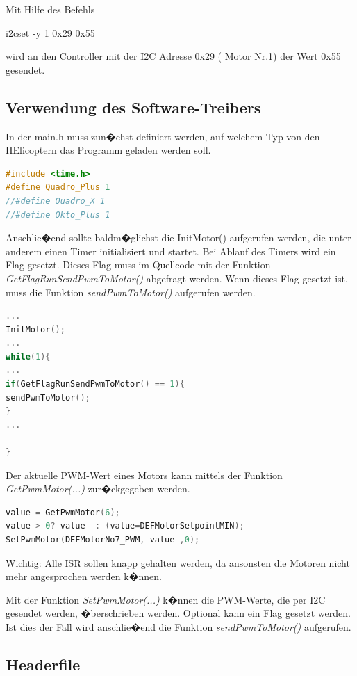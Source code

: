 Mit Hilfe des Befehls 

\begin{center}
	i2cset -y 1 0x29 0x55
\end{center}

wird an den Controller mit der I2C Adresse 0x29 ( Motor Nr.1) der Wert 0x55 gesendet.

\subsection{Verwendung des Software-Treibers}

In der main.h muss zun�chst definiert werden, auf welchem Typ von den HElicoptern das Programm geladen werden soll.
\begin{lstlisting}[language=C++]
#include <time.h>
#define Quadro_Plus 1
//#define Quadro_X 1
//#define Okto_Plus 1
\end{lstlisting}

Anschlie�end sollte baldm�glichst die InitMotor() aufgerufen werden, die unter anderem einen Timer initialisiert und startet. Bei Ablauf des Timers wird ein Flag gesetzt. Dieses Flag muss im Quellcode mit der Funktion \emph{GetFlagRunSendPwmToMotor()} abgefragt werden. Wenn dieses Flag gesetzt ist, muss die Funktion \emph{sendPwmToMotor()} aufgerufen werden.

\begin{lstlisting}[language=C++]
...
InitMotor();
...
while(1){
...
if(GetFlagRunSendPwmToMotor() == 1){
sendPwmToMotor();
}
...

}
\end{lstlisting}
Der aktuelle PWM-Wert eines Motors kann mittels der Funktion \emph{GetPwmMotor(...)} zur�ckgegeben werden.

\begin{lstlisting}[language=C++]
value = GetPwmMotor(6);
value > 0? value--: (value=DEFMotorSetpointMIN);
SetPwmMotor(DEFMotorNo7_PWM, value ,0);
\end{lstlisting}

Wichtig: Alle ISR sollen knapp gehalten werden, da ansonsten die Motoren nicht mehr angesprochen werden k�nnen.

Mit der Funktion \emph{SetPwmMotor(...)} k�nnen die PWM-Werte, die  per I2C gesendet werden, �berschrieben werden. Optional kann ein Flag gesetzt werden. Ist dies der Fall wird anschlie�end die Funktion \emph{sendPwmToMotor()} aufgerufen.

\subsection{Headerfile}

